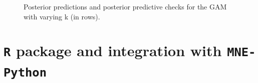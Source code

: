 \documentclass[
  doc,
  floatsintext,
  longtable,
  a4paper,
  nolmodern,
  notxfonts,
  notimes,
  colorlinks=true,linkcolor=blue,citecolor=blue,urlcolor=blue]{apa7}
\begin{document}
\begin{figure}[!htb]

\caption{\label{fig-choose-k}Posterior predictions and posterior
predictive checks for the GAM with varying k (in rows).}


\end{figure}%

\clearpage
\thispagestyle{empty}
\null

\section{\texorpdfstring{\texttt{R} package and integration with
\texttt{MNE-Python}}{R package and integration with MNE-Python}}\label{apx-package}

\setlength{\parindent}{0pt}
\setlength{\parskip}{6pt}
\end{document}
